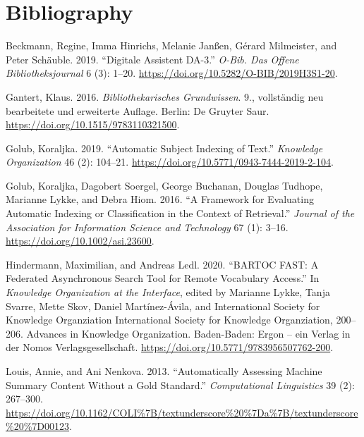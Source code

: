 \hypertarget{bibliography}{%
\section*{Bibliography}\label{bibliography}}

\hypertarget{refs}{}
\begin{CSLReferences}{1}{0}
\leavevmode\hypertarget{ref-Beckmann.2019}{}%
Beckmann, Regine, Imma Hinrichs, Melanie Janßen, Gérard Milmeister, and
Peter Schäuble. 2019. {``Digitale Assistent DA-3.''} \emph{O-Bib. Das
Offene Bibliotheksjournal} 6 (3): 1--20.
\url{https://doi.org/10.5282/O-BIB/2019H3S1-20}.

\leavevmode\hypertarget{ref-Gantert.2016}{}%
Gantert, Klaus. 2016. \emph{Bibliothekarisches Grundwissen}. 9.,
vollst{ä}ndig neu bearbeitete und erweiterte Auflage. Berlin: {De
Gruyter Saur}. \url{https://doi.org/10.1515/9783110321500}.

\leavevmode\hypertarget{ref-Golub.2019}{}%
Golub, Koraljka. 2019. {``Automatic Subject Indexing of Text.''}
\emph{Knowledge Organization} 46 (2): 104--21.
\url{https://doi.org/10.5771/0943-7444-2019-2-104}.

\leavevmode\hypertarget{ref-Golub.2016}{}%
Golub, Koraljka, Dagobert Soergel, George Buchanan, Douglas Tudhope,
Marianne Lykke, and Debra Hiom. 2016. {``A Framework for Evaluating
Automatic Indexing or Classification in the Context of Retrieval.''}
\emph{Journal of the Association for Information Science and Technology}
67 (1): 3--16. \url{https://doi.org/10.1002/asi.23600}.

\leavevmode\hypertarget{ref-Hindermann.2020}{}%
Hindermann, Maximilian, and Andreas Ledl. 2020. {``BARTOC FAST: A
Federated Asynchronous Search Tool for Remote Vocabulary Access.''} In
\emph{Knowledge Organization at the Interface}, edited by Marianne
Lykke, Tanja Svarre, Mette Skov, Daniel Martínez-Ávila, and
International Society for Knowledge Organziation International Society
for Knowledge Organziation, 200--206. Advances in Knowledge
Organization. Baden-Baden: {Ergon -- ein Verlag in der Nomos
Verlagsgesellschaft}. \url{https://doi.org/10.5771/9783956507762-200}.

\leavevmode\hypertarget{ref-Louis.2013}{}%
Louis, Annie, and Ani Nenkova. 2013. {``Automatically Assessing Machine
Summary Content Without a Gold Standard.''} \emph{Computational
Linguistics} 39 (2): 267--300.
\url{https://doi.org/10.1162/COLI\%7B/textunderscore\%20\%7Da\%7B/textunderscore\%20\%7D00123}.


\end{CSLReferences}
